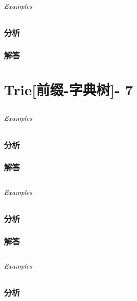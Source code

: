 \documentclass[UTF8,a4paper,12pt]{ctexbook}
\begin{document}
	\subparagraph{Examples}
	
	\subsection{分析}
	
	\subsection{解答}
\chapter{Trie[前缀-字典树]- 7}
\section{}
	
	\subparagraph{Examples}
	
	\subsection{分析}
	
	\subsection{解答}
	
\section{}
	
	\subparagraph{Examples}
	
	\subsection{分析}
	
	\subsection{解答}
	
\section{}
	
	\subparagraph{Examples}
	
	\subsection{分析}
	
\end{document}
